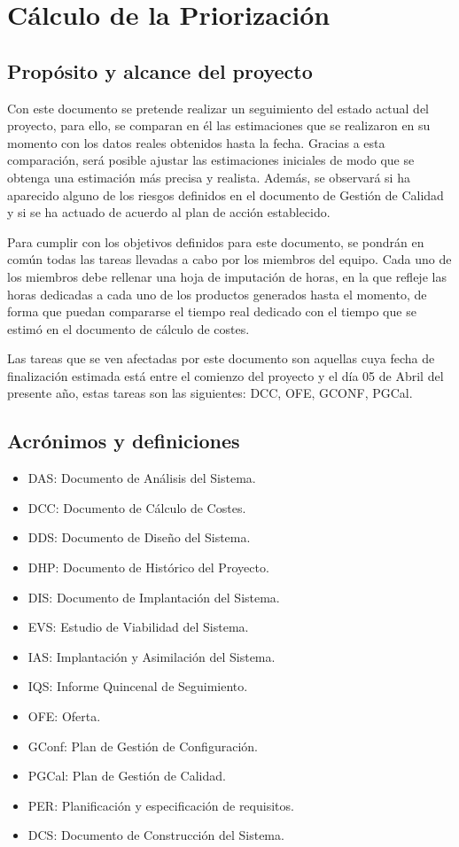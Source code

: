 \section{Cálculo de la Priorización}

\subsection{Propósito y alcance del proyecto}
\par Con este documento se pretende realizar un seguimiento del estado actual del proyecto, para ello, se comparan en él las estimaciones que se realizaron en su momento con los datos reales obtenidos hasta la fecha. Gracias a esta comparación, será posible ajustar las estimaciones iniciales de modo que se obtenga una estimación más precisa y realista. Además, se observará si ha aparecido alguno de los riesgos definidos en el documento de Gestión de Calidad y si se ha actuado de acuerdo al plan de acción establecido.

Para cumplir con los objetivos definidos para este documento, se pondrán en común todas las tareas llevadas a cabo por los miembros del equipo. Cada uno de los miembros debe rellenar una hoja de imputación de horas, en la que refleje las horas dedicadas a cada uno de los productos generados hasta el momento, de forma que puedan compararse el tiempo real dedicado con el tiempo que se estimó en el documento de cálculo de costes.

Las tareas que se ven afectadas por este documento son aquellas cuya fecha de finalización estimada está entre el comienzo del proyecto y el día 05 de Abril del presente año, estas tareas son las siguientes: DCC, OFE, GCONF, PGCal.

\subsection{Acrónimos y definiciones}
\begin{itemize}[-]
  \item DAS: Documento de Análisis del Sistema.
  \item DCC: Documento de Cálculo de Costes.
  \item DDS: Documento de Diseño del Sistema.
  \item DHP: Documento de Histórico del Proyecto.
  \item DIS: Documento de Implantación del Sistema.
  \item EVS: Estudio de Viabilidad del Sistema.
  \item IAS: Implantación y Asimilación del Sistema.
  \item IQS: Informe Quincenal de Seguimiento.
  \item OFE: Oferta.
  \item GConf: Plan de Gestión de Configuración.
  \item PGCal: Plan de Gestión de Calidad.
  \item PER: Planificación y especificación de requisitos.
  \item  DCS: Documento de Construcción del Sistema.
\end{itemize}
